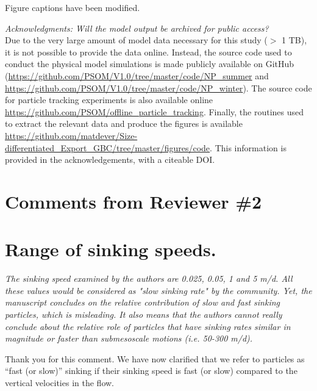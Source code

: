 \documentclass[12pt,letter]{article}
\begin{document}
{\color{blue}Figure captions have been modified.\\}

\textit{Acknowledgments: Will the model output be archived for public access?}\\
{\color{blue} Due to the very large amount of model data necessary for this study ($>$ 1 TB), it is not possible to provide the data online. Instead, the source code used to conduct the physical model simulations is made publicly available on GitHub (\url{https://github.com/PSOM/V1.0/tree/master/code/NP_summer} and \url{https://github.com/PSOM/V1.0/tree/master/code/NP_winter}). The source code for particle tracking experiments is also available online \url{https://github.com/PSOM/offline_particle_tracking}. Finally, the routines used to extract the relevant data and produce the figures is available \url{https://github.com/matdever/Size-differentiated_Export_GBC/tree/master/figures/code}. This information is provided in the acknowledgements, with a citeable DOI.}

\section{Comments from Reviewer \#2}

\section*{Range of sinking speeds.}
\textit{The sinking speed examined by the authors are 0.025, 0.05, 1 and 5 m/d. All these values would be considered as "slow sinking rate" by the community. Yet, the manuscript concludes on the relative contribution of slow and fast sinking particles, which is misleading. It also means that the authors cannot really conclude about the relative role of particles that have sinking rates similar in magnitude or faster than submesoscale motions (i.e. 50-300 m/d).}

{\color{blue}Thank you for this comment. We have now clarified that we refer to particles as ``fast (or slow)'' sinking if their sinking speed is fast (or slow) compared to the vertical velocities in the flow.} \\
\end{document}
